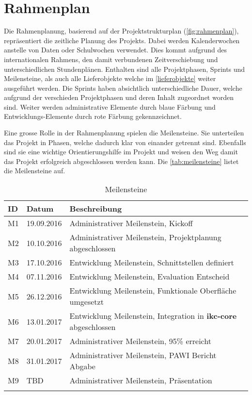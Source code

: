 \newpage

\section{Rahmenplan}
Die Rahmenplanung, basierend auf der Projektstrukturplan (\autoref{fig:rahmenplan}), repräsentiert die zeitliche Planung des Projekts. Dabei werden Kalenderwochen anstelle von Daten oder Schulwochen verwendet. Dies kommt aufgrund des internationalen Rahmens, den damit verbundenen Zeitverschiebung und unterschiedlichen Stundenplänen. Enthalten sind alle Projektphasen, Sprints und Meilensteine, als auch alle Lieferobjekte welche im \autoref{lieferobjekte} weiter ausgeführt werden. Die Sprints haben absichtlich unterschiedliche Dauer, welche aufgrund der verschieden Projektphasen und deren Inhalt zugeordnet worden sind. Weiter werden administrative Elemente durch blaue Färbung und Entwicklungs-Elemente durch rote Färbung gekennzeichnet.

Eine grosse Rolle in der Rahmenplanung spielen die Meilensteine. Sie unterteilen das Projekt in Phasen, welche dadurch klar von einander getrennt sind. Ebenfalls sind sie eine wichtige Orientierungshilfe im Projekt und weisen den Weg damit das Projekt erfolgreich abgeschlossen werden kann. Die \autoref{tab:meilensteine} listet die Meilensteine auf.


\begin{longtable}{|p{1cm}|p{2cm}|p{8.5cm}|}
  \hline
    ID & Datum &  Beschreibung \\\hline
    M1 & 19.09.2016 & Administrativer Meilenstein, Kickoff\\\hline
    M2 & 10.10.2016 & Administrativer Meilenstein, Projektplanung abgeschlossen\\\hline
    M3 & 17.10.2016 & Entwicklung Meilenstein, Schnittstellen definiert\\\hline
    M4 & 07.11.2016 & Entwicklung Meilenstein, Evaluation Entscheid\\\hline
    M5 & 26.12.2016 & Entwicklung Meilenstein, Funktionale Oberfläche umgesetzt\\\hline
    M6 & 13.01.2017 & Entwicklung Meilenstein, Integration in \textbf{ikc-core} abgeschlossen\\\hline
    M7 & 20.01.2017 & Administrativer Meilenstein, 95\% erreicht\\\hline
    M8 & 31.01.2017 & Administrativer Meilenstein, PAWI Bericht Abgabe\\\hline
    M9 & TBD & Administrativer Meilenstein, Präsentation\\\hline
    \caption{Meilensteine}
  \label{tab:meilensteine}
\end{longtable}
\newpage


